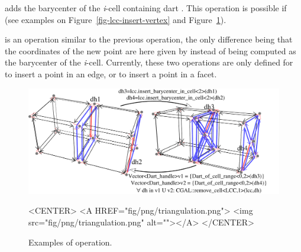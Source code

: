  adds the
barycenter of the \emph{i}-cell containing dart . This
operation is possible if \myin{} (see examples
on Figure~\ref{fig-lcc-insert-vertex} and
Figure~\ref{fig-lcc-triangulate}).

 is an operation
similar to the previous operation, the only difference being that the
coordinates of the new point are here given by  instead of being
computed as the barycenter of the \emph{i}-cell.  Currently, these two
operations are only defined for  to insert a point in an
edge, or  to insert a point in a facet.
\begin{figure}[htb]
  \begin{ccTexOnly}
    \centerline{\includegraphics[width=.85\textwidth]
      {Linear_cell_complex/fig/pdf/triangulation}}
  \end{ccTexOnly}
  \begin{ccHtmlOnly}
    <CENTER> <A HREF="fig/png/triangulation.png"> <img
    src="fig/png/triangulation.png" alt=""></A> </CENTER>
  \end{ccHtmlOnly}
  \caption{Examples of  operation.}
  \label{fig-lcc-triangulate}
\end{figure}
%

